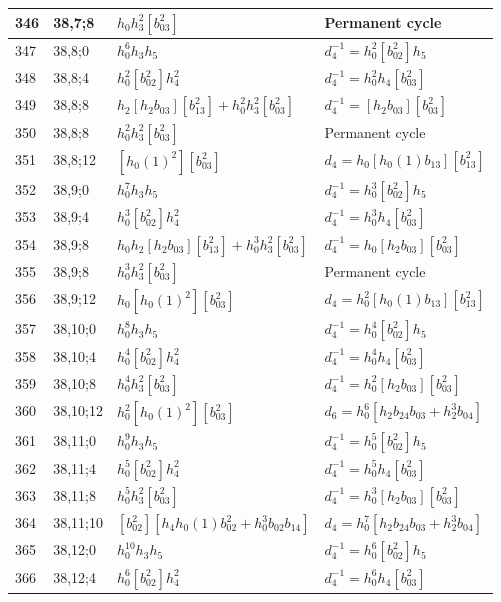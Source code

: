 \documentclass{article}
\begin{document}
\begin{longtable}{|l|l|>{\raggedright\arraybackslash}p{6cm}|>{\raggedright\arraybackslash}p{6cm}|}
\hline
346 & 38,7;8 & $h_0h_3^2[b_{03}^2]$ & Permanent cycle\\
\hline
347 & 38,8;0 & $h_0^6h_3h_5$ & $d_{4}^{-1}=h_0^2[b_{02}^2]h_5$\\
\hline
348 & 38,8;4 & $h_0^2[b_{02}^2]h_4^2$ & $d_{4}^{-1}=h_0^2h_4[b_{03}^2]$\\
\hline
349 & 38,8;8 & $h_2[h_2b_{03}][b_{13}^2] + h_0^2h_3^2[b_{03}^2]$ & $d_{4}^{-1}=[h_2b_{03}][b_{03}^2]$\\
350 & 38,8;8 & $h_0^2h_3^2[b_{03}^2]$ & Permanent cycle\\
\hline
351 & 38,8;12 & $[h_0(1)^2][b_{03}^2]$ &$d_{4}=h_0[h_0(1)b_{13}][b_{13}^2]$\\
\hline
352 & 38,9;0 & $h_0^7h_3h_5$ & $d_{4}^{-1}=h_0^3[b_{02}^2]h_5$\\
\hline
353 & 38,9;4 & $h_0^3[b_{02}^2]h_4^2$ & $d_{4}^{-1}=h_0^3h_4[b_{03}^2]$\\
\hline
354 & 38,9;8 & $h_0h_2[h_2b_{03}][b_{13}^2] + h_0^3h_3^2[b_{03}^2]$ & $d_{4}^{-1}=h_0[h_2b_{03}][b_{03}^2]$\\
355 & 38,9;8 & $h_0^3h_3^2[b_{03}^2]$ & Permanent cycle\\
\hline
356 & 38,9;12 & $h_0[h_0(1)^2][b_{03}^2]$ &$d_{4}=h_0^2[h_0(1)b_{13}][b_{13}^2]$\\
\hline
357 & 38,10;0 & $h_0^8h_3h_5$ & $d_{4}^{-1}=h_0^4[b_{02}^2]h_5$\\
\hline
358 & 38,10;4 & $h_0^4[b_{02}^2]h_4^2$ & $d_{4}^{-1}=h_0^4h_4[b_{03}^2]$\\
\hline
359 & 38,10;8 & $h_0^4h_3^2[b_{03}^2]$ & $d_{4}^{-1}=h_0^2[h_2b_{03}][b_{03}^2]$\\
\hline
360 & 38,10;12 & $h_0^2[h_0(1)^2][b_{03}^2]$ &$d_{6}=h_0^6[h_2b_{24}b_{03} + h_2^3b_{04}]$\\
\hline
361 & 38,11;0 & $h_0^9h_3h_5$ & $d_{4}^{-1}=h_0^5[b_{02}^2]h_5$\\
\hline
362 & 38,11;4 & $h_0^5[b_{02}^2]h_4^2$ & $d_{4}^{-1}=h_0^5h_4[b_{03}^2]$\\
\hline
363 & 38,11;8 & $h_0^5h_3^2[b_{03}^2]$ & $d_{4}^{-1}=h_0^3[h_2b_{03}][b_{03}^2]$\\
\hline
364 & 38,11;10 & $[b_{02}^2][h_4h_0(1)b_{02}^2 + h_0^3b_{02}b_{14}]$ &$d_{4}=h_0^7[h_2b_{24}b_{03} + h_2^3b_{04}]$\\
\hline
365 & 38,12;0 & $h_0^{10}h_3h_5$ & $d_{4}^{-1}=h_0^6[b_{02}^2]h_5$\\
\hline
366 & 38,12;4 & $h_0^6[b_{02}^2]h_4^2$ & $d_{4}^{-1}=h_0^6h_4[b_{03}^2]$\\

\end{longtable}
\end{document}
